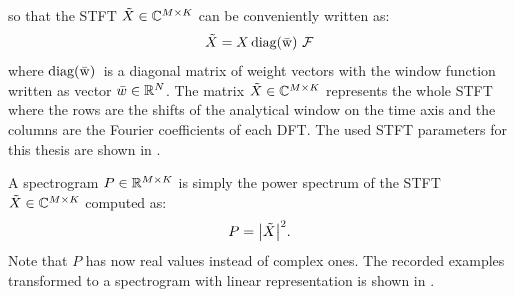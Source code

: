 so that the STFT $\tilde{X} \in \mathbb{C}^{M \times K}$ can be conveniently written as:
\begin{equation}\label{eq:signal_spec_stft_matrix}
  \tilde{X} = X \, \mathrm{diag(\bar{w})\,} \, \mathcal{F}
\end{equation}
where $\mathrm{diag(\bar{w})\,}$ is a diagonal matrix of weight vectors with the window function written as vector $\bar{w} \in \mathbb{R}^N$.
The matrix $\tilde{X} \in \mathbb{C}^{M \times K}$ represents the whole STFT where the rows are the shifts of the analytical window on the time axis and the columns are the Fourier coefficients of each DFT.
The used STFT parameters for this thesis are shown in .

A spectrogram $P \in \mathbb{R}^{M \times K}$ is simply the power spectrum of the STFT $\tilde{X} \in \mathbb{C}^{M \times K}$ computed as:
\begin{equation}\label{eq:signal_spec_spec}
  P = \abs{\tilde{X}}^2.
\end{equation}
Note that $P$ has now real values instead of complex ones.
The recorded examples transformed to a spectrogram with linear representation is shown in .
